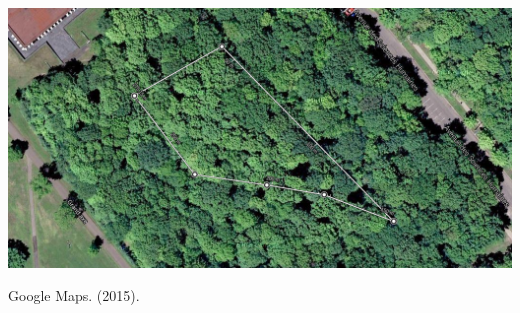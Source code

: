 \documentclass[a0paper,portrait]{baposter}
\begin{document}
\begin{poster}
{        \textbf{}
        \begin{center}
            \includegraphics[width=0.92\linewidth]{./figures/path2.png}
            \caption{Google Maps. (2015).}
        \end{center}
    }


\end{poster}
\end{document}
